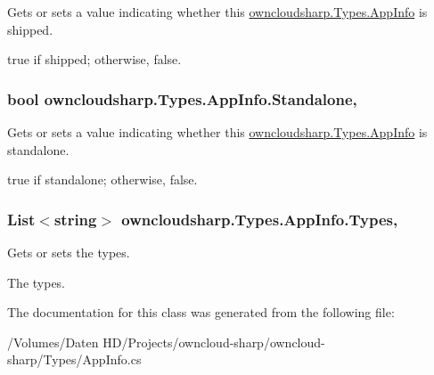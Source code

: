 Gets or sets a value indicating whether this \hyperlink{classowncloudsharp_1_1_types_1_1_app_info}{owncloudsharp.\+Types.\+App\+Info} is shipped. 

{\ttfamily true} if shipped; otherwise, {\ttfamily false}.\hypertarget{classowncloudsharp_1_1_types_1_1_app_info_a9094adc94004a3c884d0baede297ddef}{}
\subsubsection[{Standalone}]{\setlength{\rightskip}{0pt plus 5cm}bool owncloudsharp.\+Types.\+App\+Info.\+Standalone\hspace{0.3cm}{\ttfamily [get]}, {\ttfamily [set]}}\label{classowncloudsharp_1_1_types_1_1_app_info_a9094adc94004a3c884d0baede297ddef}


Gets or sets a value indicating whether this \hyperlink{classowncloudsharp_1_1_types_1_1_app_info}{owncloudsharp.\+Types.\+App\+Info} is standalone. 

{\ttfamily true} if standalone; otherwise, {\ttfamily false}.\hypertarget{classowncloudsharp_1_1_types_1_1_app_info_a25a28396809e364a14eec89e477f1320}{}
\subsubsection[{Types}]{\setlength{\rightskip}{0pt plus 5cm}List$<$string$>$ owncloudsharp.\+Types.\+App\+Info.\+Types\hspace{0.3cm}{\ttfamily [get]}, {\ttfamily [set]}}\label{classowncloudsharp_1_1_types_1_1_app_info_a25a28396809e364a14eec89e477f1320}


Gets or sets the types. 

The types.

The documentation for this class was generated from the following file\+:\begin{DoxyCompactItemize}
\item 
/\+Volumes/\+Daten H\+D/\+Projects/owncloud-\/sharp/owncloud-\/sharp/\+Types/App\+Info.\+cs\end{DoxyCompactItemize}
